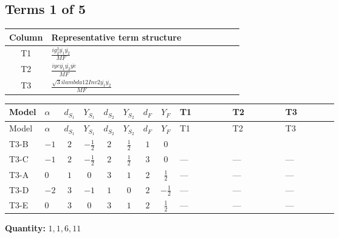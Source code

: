\documentclass[8pt]{article}
\begin{document}
\begin{landscape}
\subsection*{Terms 1 of 5}
\begin{center}
\begin{tabular}{@{}c >{\raggedright\arraybackslash}p{0.82\linewidth}@{}}
\toprule
Column & Representative term structure \\
\midrule
T1 & \(\displaystyle \frac{i g_{2}^{2} \overline{y_{1}} \overline{y_{2}}}{MF}\) \\
\midrule
T2 & \(\displaystyle \frac{i ye \overline{y_{1}} \overline{y_{2}} \overline{ye}}{MF}\) \\
\midrule
T3 & \(\displaystyle \frac{\sqrt{3} i lambda12Inv2 \overline{y_{1}} \overline{y_{2}}}{MF}\) \\
\midrule
\bottomrule
\end{tabular}
\end{center}
\smallskip
\tiny
\begin{longtable}{@{}llcccccc >{\raggedright\arraybackslash}p{0.21\linewidth} >{\raggedright\arraybackslash}p{0.21\linewidth} >{\raggedright\arraybackslash}p{0.21\linewidth}@{}}
\toprule
Model & $\alpha$ & $d_{S_1}$ & $Y_{S_1}$ & $d_{S_2}$ & $Y_{S_2}$ & $d_F$ & $Y_F$ & T1 & T2 & T3 \\
\midrule
\endfirsthead
\toprule
Model & $\alpha$ & $d_{S_1}$ & $Y_{S_1}$ & $d_{S_2}$ & $Y_{S_2}$ & $d_F$ & $Y_F$ & T1 & T2 & T3 \\
\midrule
\endhead
T3-B & $-1$ & $2$ & $-\frac{1}{2}$ & $2$ & $\frac{1}{2}$ & $1$ & $0$ & \scriptsize\adjustbox{max width=\linewidth}{$\begin{gathered} \frac{3 i g_{2}^{2} \overline{y_{1}} \overline{y_{2}}}{4 MF}\end{gathered}$} & \scriptsize\adjustbox{max width=\linewidth}{$\begin{gathered} - \frac{i ye \overline{y_{1}} \overline{y_{2}} \overline{ye}}{4 MF}\end{gathered}$} & \scriptsize\adjustbox{max width=\linewidth}{$\begin{gathered} \frac{\sqrt{3} i lambda12Inv2 \overline{y_{1}} \overline{y_{2}}}{3 MF}\end{gathered}$} \\
\midrule
T3-C & $-1$ & $2$ & $-\frac{1}{2}$ & $2$ & $\frac{1}{2}$ & $3$ & $0$ & --- & --- & --- \\
\midrule
T3-A & $0$ & $1$ & $0$ & $3$ & $1$ & $2$ & $\frac{1}{2}$ & --- & --- & --- \\
\midrule
T3-D & $-2$ & $3$ & $-1$ & $1$ & $0$ & $2$ & $-\frac{1}{2}$ & --- & --- & --- \\
\midrule
T3-E & $0$ & $3$ & $0$ & $3$ & $1$ & $2$ & $\frac{1}{2}$ & --- & --- & --- \\
\midrule
\bottomrule
\end{longtable}
\clearpage
\noindent\textbf{Quantity: }$\mathrm{1,1,6,11}$\par\smallskip

\end{landscape}
\end{document}
